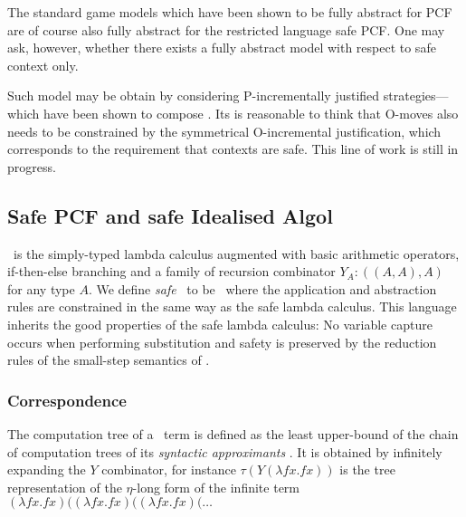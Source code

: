 The standard game models which have been shown to be fully abstract
for PCF \cite{abramsky94full,hylandong_pcf} are of course also fully
abstract for the restricted language safe PCF. One may ask, however,
whether there exists a fully abstract model with respect to safe
context only.

Such model may be obtain by considering P-incrementally justified strategies---which have been shown to compose \cite{Blumphd}. Its is reasonable to think that O-moves also needs to be constrained by the symmetrical O-incremental justification, which corresponds to the requirement that contexts are safe. This line of work is still in progress.


\subsection*{Safe PCF and safe Idealised Algol}

\pcf\ is the simply-typed lambda calculus augmented with basic
arithmetic operators, if-then-else branching and a family of
recursion combinator $Y_A : ((A,A),A)$ for any type $A$.  We define
\emph{safe} \pcf\ to be \pcf\ where the application and abstraction
rules are constrained in the same way as the safe lambda calculus.
This language inherits the good properties of the safe lambda
calculus: No variable capture occurs when performing substitution
and safety is preserved by the reduction rules of the small-step
semantics of \pcf.

\subsubsection{Correspondence}

The computation tree of a \pcf\ term is defined as the least
upper-bound of the chain of computation trees of its \emph{syntactic
approximants} \cite{abramsky:game-semantics-tutorial}.  It is
obtained by infinitely expanding the $Y$ combinator, for instance
$\tau(Y (\lambda f x. f x))$ is the tree representation of the
$\eta$-long form of the infinite term $(\lambda f x. f x)
 ((\lambda f x. f x) ((\lambda f x. f x) ( \ldots$

